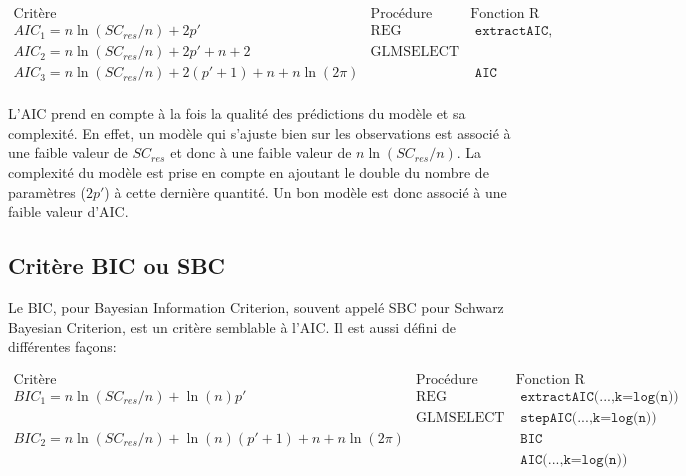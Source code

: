 \small
$$\begin{array}{lcc}
\text{Critère}&\text{Procédure SAS }&\text{Fonction R}\\\hline
AIC_1=n\ln(SC_{res}/n)+2p' &\text{REG}& \texttt{ extractAIC, stepAIC}\\
AIC_2=n\ln(SC_{res}/n)+2p'+n+2 &\text{GLMSELECT}& \\
AIC_3=n\ln(SC_{res}/n)+2(p'+1)+n + n\ln(2\pi) && \texttt{ AIC}\\
\end{array}
$$

\normalsize
L'AIC prend en compte à la fois la qualité des prédictions du modèle et sa complexité. En
effet, un modèle qui s'ajuste bien sur les observations est associé à une faible valeur de $SC_{res}$
et donc à une faible valeur de $n\ln(SC_{res}/n)$. La complexité du modèle est prise en compte en
ajoutant le double du nombre de paramètres ($2p'$) à cette dernière quantité. Un bon modèle est donc associé à une faible valeur d'AIC.

\subsection{Critère BIC ou SBC}

Le BIC, pour Bayesian Information Criterion, souvent appelé SBC pour Schwarz Bayesian Criterion, est un critère semblable à l'AIC. Il est aussi défini de différentes façons:


\small
$$\begin{array}{lcc}
\text{Critère}&\text{Procédure SAS }&\text{Fonction R}\\\hline
BIC_1=n\ln(SC_{res}/n)+\ln(n)p' &\text{REG}& \texttt{ extractAIC(...,k=log(n))}\\
                 &\text{GLMSELECT}&  \texttt{ stepAIC(...,k=log(n))}\\
BIC_2=n\ln(SC_{res}/n)+\ln(n)(p'+1)+n+ n\ln(2\pi) && \texttt{ BIC}\\
&& \texttt{ AIC(...,k=log(n))}\\
\end{array}
$$

\normalsize

